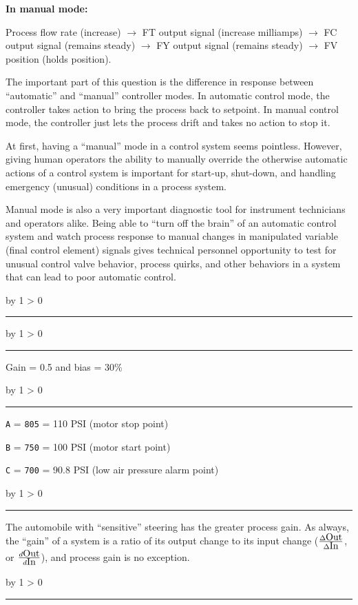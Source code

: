 \documentclass[12pt,a4paper]{article}
\def\svar{
           \advance\answnum by 1
           \ifnum \answnum > 0
                \hrule
                \vskip 3pt
                \leftline{Svar \the\answnum}
                \vskip 3pt \fi}
\begin{document}
\vskip 10pt

\noindent
{\bf In manual mode:}

Process flow rate (increase) $\to$ FT output signal (increase milliamps) $\to$ FC output signal (remains steady) $\to$ FY output signal (remains steady) $\to$ FV position (holds position).

\vskip 10pt

The important part of this question is the difference in response between ``automatic'' and ``manual'' controller modes.  In automatic control mode, the controller takes action to bring the process back to setpoint.  In manual control mode, the controller just lets the process drift and takes no action to stop it.

At first, having a ``manual'' mode in a control system seems pointless.  However, giving human operators the ability to manually override the otherwise automatic actions of a control system is important for start-up, shut-down, and handling emergency (unusual) conditions in a process system.  

Manual mode is also a very important diagnostic tool for instrument technicians and operators alike.  Being able to ``turn off the brain'' of an automatic control system and watch process response to manual changes in manipulated variable (final control element) signals gives technical personnel opportunity to test for unusual control valve behavior, process quirks, and other behaviors in a system that can lead to poor automatic control. 


\vskip 10pt \filbreak 
\svar{} 


\vskip 10pt \filbreak 
\svar{} 

Gain = 0.5 and bias = 30\%

\vskip 10pt \filbreak 
\svar{} 

{\tt A} = {\tt 805} = 110 PSI (motor stop point)

{\tt B} = {\tt 750} = 100 PSI (motor start point)

{\tt C} = {\tt 700} = 90.8 PSI (low air pressure alarm point)

\vskip 10pt \filbreak 
\svar{} 

The automobile with ``sensitive'' steering has the greater process gain.  As always, the ``gain'' of a system is a ratio of its output change to its input change ($\Delta \hbox{Out} \over \Delta \hbox{In}$, or $d \hbox{Out} \over d \hbox{In}$), and process gain is no exception.

\vskip 10pt \filbreak 
\svar{} 
\end{document}
